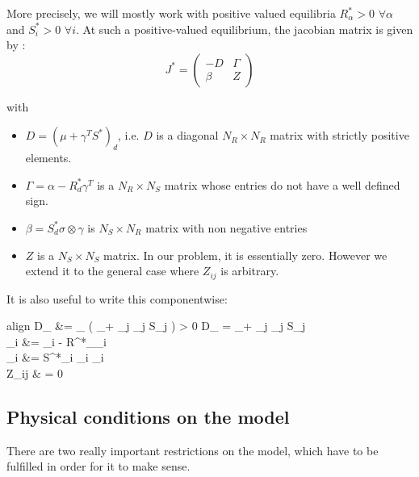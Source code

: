 \documentclass[12pt, titlepage]{report}
\begin{document}
	 More precisely, we will mostly work with positive valued equilibria \ie $R^*_\alpha > 0$ $\forall \alpha$ and $S^*_i > 0$ $\forall i$. At such a positive-valued equilibrium, the jacobian matrix is given by :
	\begin{equation}
		J^* =
		\begin{pmatrix}
		-D & \Gamma \\
		\beta & Z
		\end{pmatrix}
	\end{equation}

	with
	\begin{itemize}
		\item $D = \left(\mu+\gamma^T S^*\right)_d$, i.e. $D$ is a diagonal $N_R \times N_R$ matrix with strictly positive elements.
		\item $\Gamma = \alpha - R^*_d \gamma^T $ is a $N_R \times N_S$ matrix whose entries do not have a well defined sign.
		\item $\beta = S^*_d \sigma \otimes \gamma $ is $N_S \times N_R$ matrix with non negative entries
		\item $Z$ is a $N_S \times N_S$ matrix. In our problem, it is essentially zero. However we extend it to the general case where $Z_{ij}$ is arbitrary.
	\end{itemize}

	It is also useful to write this componentwise:

	\begin{empheq}{align}
		D_{\alpha\beta} &= \delta_{\alpha\beta} \left( \mu_\alpha + \sum_j \gamma_{j\alpha} S_j \right) > 0  D_{\alpha} =  \mu_\alpha + \sum_j \gamma_{j\alpha} S_j \\
		\Gamma_{\alpha i} &= \alpha_{\alpha i} - R^*_\alpha \gamma_{i \alpha} \\
		\beta_{i \alpha} &= S^*_i \sigma_{i \alpha} \gamma_{i \alpha}  \\
		Z_{ij} & = 0 \\
	\end{empheq}
		\subsection{Physical conditions on the model}
	There are two really important restrictions on the model, which have to be fulfilled in order for it to make sense.
\end{document}

